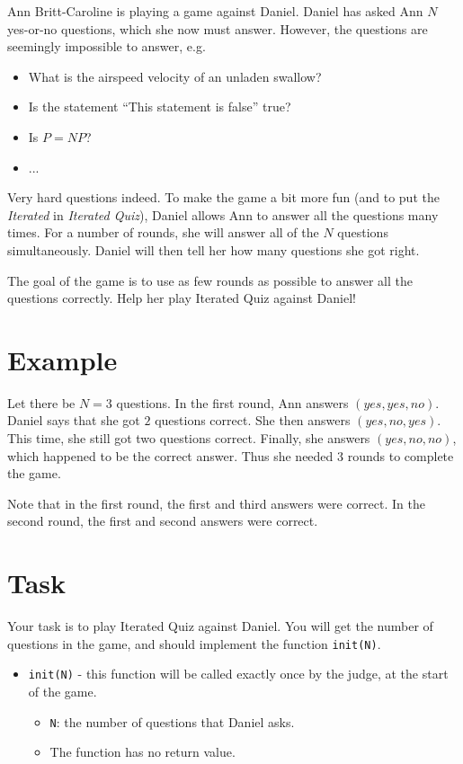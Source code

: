 \newcommand\version{v1}
Ann Britt-Caroline is playing a game against Daniel. Daniel has asked Ann $N$ yes-or-no questions, which she now must answer.
However, the questions are seemingly impossible to answer, e.g.
\begin{itemize}
  \item What is the airspeed velocity of an unladen swallow?
  \item Is the statement ``This statement is false'' true?
  \item Is $P = NP$?
  \item ...
\end{itemize}
Very hard questions indeed. To make the game a bit more fun (and to put the \emph{Iterated} in \emph{Iterated Quiz}), Daniel allows Ann to answer all the questions
many times. For a number of rounds, she will answer all of the $N$ questions simultaneously. Daniel will then tell her how many questions she got right.

The goal of the game is to use as few rounds as possible to answer all the questions correctly.
Help her play Iterated Quiz against Daniel!

\section*{Example}
Let there be $N = 3$ questions. In the first round, Ann answers $(yes, yes, no)$. Daniel says that she got $2$ questions correct. She then answers $(yes, no, yes)$. This time, she still got two questions correct. Finally, she
answers $(yes, no, no)$, which happened to be the correct answer. Thus she needed 3 rounds to complete the game.

Note that in the first round, the first and third answers were correct. In the second round, the first and second answers were correct.

\section*{Task}
Your task is to play Iterated Quiz against Daniel. You will get the number of questions in the game, and should implement the function \texttt{init(N)}.
\begin{itemize}
  \item \texttt{init(N)} - this function will be called exactly once by the judge, at the start of the game.
    \begin{itemize}
      \item \texttt{N}: the number of questions that Daniel asks.
      \item The function has no return value.
    \end{itemize}
\end{itemize}

